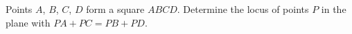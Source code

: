 Points $A$, $B$, $C$, $D$ form a square $ABCD$. Determine the locus of points $P$ in the plane with $PA+PC=PB+PD$.
